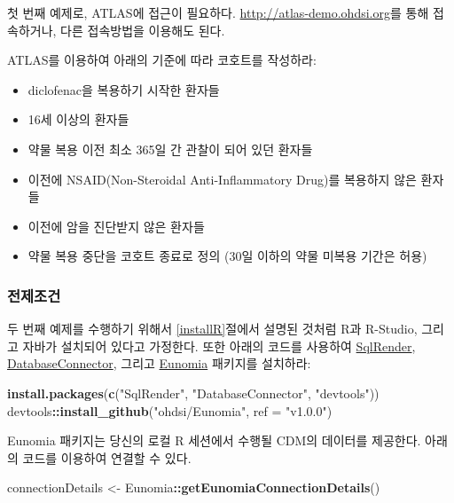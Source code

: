 \documentclass[11pt]{book}
\newenvironment{Shaded}{\begin{snugshade}}{\end{snugshade}}
\newcommand{\KeywordTok}[1]{\textcolor[rgb]{0.13,0.29,0.53}{\textbf{#1}}}
\newcommand{\DataTypeTok}[1]{\textcolor[rgb]{0.13,0.29,0.53}{#1}}
\newcommand{\StringTok}[1]{\textcolor[rgb]{0.31,0.60,0.02}{#1}}
\newcommand{\OperatorTok}[1]{\textcolor[rgb]{0.81,0.36,0.00}{\textbf{#1}}}
\newcommand{\NormalTok}[1]{#1}
\providecommand{\tightlist}{%
  \setlength{\itemsep}{0pt}\setlength{\parskip}{0pt}}
\theoremstyle{definition}
\theoremstyle{definition}
\theoremstyle{definition}
\theoremstyle{remark}
\let\BeginKnitrBlock\begin \let\EndKnitrBlock\end
\begin{document}
첫 번째 예제로, ATLAS에 접근이 필요하다.
\url{http://atlas-demo.ohdsi.org}를 통해 접속하거나, 다른 접속방법을
이용해도 된다.

\BeginKnitrBlock{exercise}
\protect\hypertarget{exr:exerciseCohortsAtlas}{}{\label{exr:exerciseCohortsAtlas}
}ATLAS를 이용하여 아래의 기준에 따라 코호트를 작성하라:

\begin{itemize}
\tightlist
\item
  diclofenac을 복용하기 시작한 환자들
\item
  16세 이상의 환자들
\item
  약물 복용 이전 최소 365일 간 관찰이 되어 있던 환자들
\item
  이전에 NSAID(Non-Steroidal Anti-Inflammatory Drug)를 복용하지 않은
  환자들
\item
  이전에 암을 진단받지 않은 환자들
\item
  약물 복용 중단을 코호트 종료로 정의 (30일 이하의 약물 미복용 기간은
  허용)
\end{itemize}
\EndKnitrBlock{exercise}

\subsubsection*{전제조건}\label{-3}

두 번째 예제를 수행하기 위해서 \ref{installR}절에서 설명된 것처럼 R과
R-Studio, 그리고 자바가 설치되어 있다고 가정한다. 또한 아래의 코드를
사용하여 \href{https://ohdsi.github.io/SqlRender/}{SqlRender},
\href{https://ohdsi.github.io/DatabaseConnector/}{DatabaseConnector},
그리고 \href{https://ohdsi.github.io/Eunomia/}{Eunomia} 패키지를
설치하라:

\begin{Shaded}
\begin{Highlighting}[]
\KeywordTok{install.packages}\NormalTok{(}\KeywordTok{c}\NormalTok{(}\StringTok{"SqlRender"}\NormalTok{, }\StringTok{"DatabaseConnector"}\NormalTok{, }\StringTok{"devtools"}\NormalTok{))}
\NormalTok{devtools}\OperatorTok{::}\KeywordTok{install_github}\NormalTok{(}\StringTok{"ohdsi/Eunomia"}\NormalTok{, }\DataTypeTok{ref =} \StringTok{"v1.0.0"}\NormalTok{)}
\end{Highlighting}
\end{Shaded}

Eunomia 패키지는 당신의 로컬 R 세션에서 수행될 CDM의 데이터를 제공한다.
아래의 코드를 이용하여 연결할 수 있다.

\begin{Shaded}
\begin{Highlighting}[]
\NormalTok{connectionDetails <-}\StringTok{ }\NormalTok{Eunomia}\OperatorTok{::}\KeywordTok{getEunomiaConnectionDetails}\NormalTok{()}
\end{Highlighting}
\end{Shaded}
\end{document}
